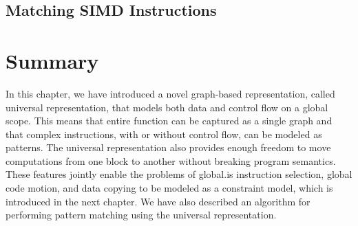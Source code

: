 \subsection{Matching SIMD Instructions}



\section{Summary}

In this chapter, we have introduced a novel graph-based representation, called
\gls{universal representation}, that models both data and control flow on a
global scope.
%
This means that entire \gls{function} can be captured as a single graph and that
complex \glspl{instruction}, with or without control flow, can be modeled as
\glspl{pattern}.
%
The \gls{universal representation} also provides enough freedom to move
computations from one \gls{block} to another without breaking \gls{program}
semantics.
%
These features jointly enable the problems of \gls{global.is} \gls{instruction
  selection}, \gls{global code motion}, and \gls{data copying} to be modeled as
a \gls{constraint model}, which is introduced in the next chapter.
%
We have also described an algorithm for performing \gls{pattern matching} using
the \gls{universal representation}.
